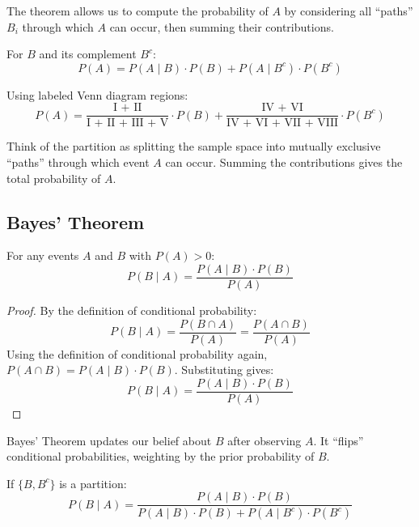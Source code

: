 \begin{explanation}
The theorem allows us to compute the probability of $A$ by considering all “paths” $B_i$ through which $A$ can occur, then summing their contributions.
\end{explanation}

\begin{eg}
For $B$ and its complement $B^c$:
\[
P(A) = P(A \mid B) \cdot P(B) + P(A \mid B^c) \cdot P(B^c)
\]
\end{eg}

\begin{eg}
Using labeled Venn diagram regions:
\[
P(A) = \frac{\text{I + II}}{\text{I + II + III + V}} \cdot P(B) + \frac{\text{IV + VI}}{\text{IV + VI + VII + VIII}} \cdot P(B^c)
\]
\end{eg}

\begin{intuition}
Think of the partition as splitting the sample space into mutually exclusive “paths” through which event $A$ can occur. Summing the contributions gives the total probability of $A$.
\end{intuition}

\subsection{Bayes' Theorem}

\begin{theorem}
For any events $A$ and $B$ with $P(A) > 0$:
\[
P(B \mid A) = \frac{P(A \mid B) \cdot P(B)}{P(A)}
\]
\end{theorem}

\begin{proof}
By the definition of conditional probability:
\[
P(B \mid A) = \frac{P(B \cap A)}{P(A)} = \frac{P(A \cap B)}{P(A)}
\]
Using the definition of conditional probability again, $P(A \cap B) = P(A \mid B) \cdot P(B)$. Substituting gives:
\[
P(B \mid A) = \frac{P(A \mid B) \cdot P(B)}{P(A)}
\]
\end{proof}

\begin{explanation}
Bayes’ Theorem updates our belief about $B$ after observing $A$. It “flips” conditional probabilities, weighting by the prior probability of $B$.
\end{explanation}

\begin{eg}
If $\{B, B^c\}$ is a partition:
\[
P(B \mid A) = \frac{P(A \mid B) \cdot P(B)}{P(A \mid B) \cdot P(B) + P(A \mid B^c) \cdot P(B^c)}
\]
\end{eg}

